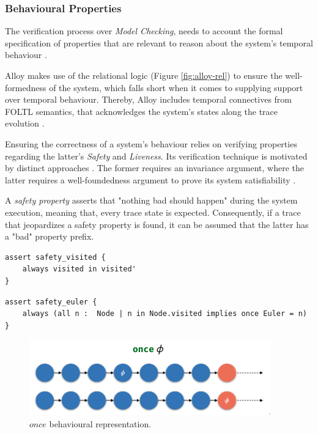 \subsubsection{Behavioural Properties}

The verification process over \textit{Model Checking}, needs to account the formal specification of properties that are relevant to reason about the system's temporal behaviour \cite{baier2008principles} .

Alloy makes use of the relational logic (Figure \ref{fig:alloy-rel}) to ensure the well-formedness of the system, which falls short when it comes to supplying support over temporal behaviour. Thereby, Alloy includes temporal connectives from FOLTL semantics, that acknowledges the system's states along the trace evolution \cite{lwspecification, alloy-6, 9341085}.

Ensuring the correctness of a system's behaviour relies on verifying properties regarding the latter's \textit{Safety} and \textit{Liveness}. Its verification technique is motivated by distinct approaches \cite{kindler1994safety}. The former requires an invariance argument, where the latter requires a well-foundedness argument to prove its system satisfiability \cite{alpern1987recognizing}.

A \textit{safety property} asserts that "nothing bad should happen" during the system execution, meaning that, every trace state is expected. Consequently, if a trace that jeopardizes a safety property is found, it can be assumed that the latter has a "bad" property prefix. 

\begin{lstlisting}[title={\textit{Safety Property}: The relation visited can only evolve through time.}, otherkeywords = {always, assert, module, set, fact, iden, no, in, \=, \*, \+, \~, \-\>, \&, '}, floatplacement=H]
assert safety_visited {
    always visited in visited'
} 
\end{lstlisting}

\begin{lstlisting}[title={\textit{Safety Property}: If a node is visited, then once \textit{Euler} was 'inside' it.}, otherkeywords = {always, assert, module, set, fact, iden, no, in, \=, \*, \+, \~, \-\>, \&, all, \:, \., implies, once}, floatplacement=H]
assert safety_euler {
    always (all n :  Node | n in Node.visited implies once Euler = n)
} 
\end{lstlisting}

\begin{figure}[H]
    \centering
    \includegraphics[width=0.6\linewidth]{img/alloy_once.png}
    \caption{$once$ behavioural representation.}
    \label{fig:alloy-once}
\end{figure}

